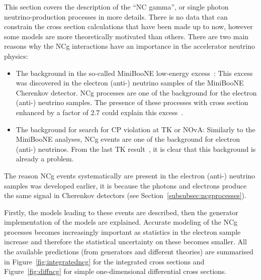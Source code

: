 
This section covers the description of the ``\Gls{NC} gamma'', or
single photon neutrino-production processes in more details. There is
no data that can constrain the cross section calculations that have
been made up to now, however some models are more theoretically
motivated than others. There are two main reasons why the \Gls{NCg}
interactions have an importance in the accelerator neutrino physics:
\begin{itemize}[noitemsep,topsep=0pt]
\item The background in the so-called \Gls{MiniBooNE} low-energy
  excess~\cite{MBexcess2009,AnuMiniBooNE2013}: This excess was
  discovered in the electron (anti-) neutrino samples of the
  \Gls{MiniBooNE} Cherenkov detector. \Gls{NCg} processes are one of
  the background for the electron (anti-) neutrino samples. The
  presence of these processes with cross section enhanced by a factor
  of 2.7 could explain this excess~\cite{MBexcess2009}.
\item The background for search for \Gls{CP} violation at \Gls{TK} or
  \Gls{NOvA}: Similarly to the \Gls{MiniBooNE} analyses, \Gls{NCg}
  events are one of the background for electron (anti-)
  neutrinos. From the last \Gls{TK} result~\cite{LastT2K}, it is clear
  that this background is already a problem.
\end{itemize}

The reason \Gls{NCg} events systematically are present in the electron
(anti-) neutrino samples was developed earlier, it is because the
photons and electrons produce the same signal in Cherenkov detectors
(see Section~\ref{subsubsec:ncgprocesses}).

Firstly, the models leading to these events are described, then the
generator implementation of the models are explained. Accurate
modeling of the \Gls{NCg} processes becomes increasingly important as
statistics in the electron sample increase and therefore the
statistical uncertainty on these becomes smaller. All the available
predictions (from generators and different theories) are summarised in
Figure~\ref{fig:integratedncg} for the integrated cross sections and
Figure~\ref{fig:diffncg} for simple one-dimensional differential cross
sections.

